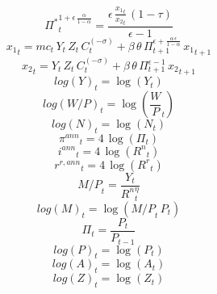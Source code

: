 \begin{dmath}
{{\Pi^*}}_{t}^{1+{{\epsilon}}\, \frac{{{\alpha}}}{1-{{\alpha}}}}=\frac{{{\epsilon}}\, \frac{{{x_1}}_{t}}{{{x_2}}_{t}}\, \left(1-{{\tau}}\right)}{{{\epsilon}}-1}
\end{dmath}
\begin{dmath}
{{x_1}}_{t}={{mc}}_{t}\, {{Y}}_{t}\, {{Z}}_{t}\, {{C}}_{t}^{\left(-{{\sigma}}\right)}+{{\beta}}\, {{\theta}}\, {{\Pi}}_{t+1}^{{{\epsilon}}+\frac{{{\alpha}}\, {{\epsilon}}}{1-{{\alpha}}}}\, {{x_1}}_{t+1}
\end{dmath}
\begin{dmath}
{{x_2}}_{t}={{Y}}_{t}\, {{Z}}_{t}\, {{C}}_{t}^{\left(-{{\sigma}}\right)}+{{\beta}}\, {{\theta}}\, {{\Pi}}_{t+1}^{{{\epsilon}}-1}\, {{x_2}}_{t+1}
\end{dmath}
\begin{dmath}
{{log(Y)}}_{t}=\log\left({{Y}}_{t}\right)
\end{dmath}
\begin{dmath}
{{log(W/P)}}_{t}=\log\left({{\frac{W}{P}}}_{t}\right)
\end{dmath}
\begin{dmath}
{{log(N)}}_{t}=\log\left({{N}}_{t}\right)
\end{dmath}
\begin{dmath}
{{\pi^{ann}}}_{t}=4\, \log\left({{\Pi}}_{t}\right)
\end{dmath}
\begin{dmath}
{{i^{ann}}}_{t}=4\, \log\left({{R^n}}_{t}\right)
\end{dmath}
\begin{dmath}
{{r^{r,ann}}}_{t}=4\, \log\left({{R^{r}}}_{t}\right)
\end{dmath}
\begin{dmath}
{{M/P}}_{t}=\frac{{{Y}}_{t}}{{{R^n}}_{t}^{{{\eta}}}}
\end{dmath}
\begin{dmath}
{{log(M)}}_{t}=\log\left({{M/P}}_{t}\, {{P}}_{t}\right)
\end{dmath}
\begin{dmath}
{{\Pi}}_{t}=\frac{{{P}}_{t}}{{{P}}_{t-1}}
\end{dmath}
\begin{dmath}
{{log(P)}}_{t}=\log\left({{P}}_{t}\right)
\end{dmath}
\begin{dmath}
{{log(A)}}_{t}=\log\left({{A}}_{t}\right)
\end{dmath}
\begin{dmath}
{{log(Z)}}_{t}=\log\left({{Z}}_{t}\right)
\end{dmath}
